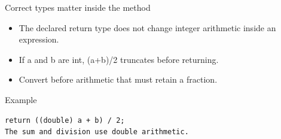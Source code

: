 \documentclass[10pt,aspectratio=169]{beamer}
\begin{document}
\begin{frame}[fragile,t]{Correct types matter inside the method}
\begin{itemize}
\item The declared return type does not change integer arithmetic inside an expression.
\item If a and b are int, (a+b)/2 truncates before returning.
\item Convert before arithmetic that must retain a fraction.
\end{itemize}
\vspace{1mm}\begin{block}{Example}
\begin{lstlisting}
return ((double) a + b) / 2;
The sum and division use double arithmetic.
\end{lstlisting}
\end{block}
\end{frame}
\end{document}
